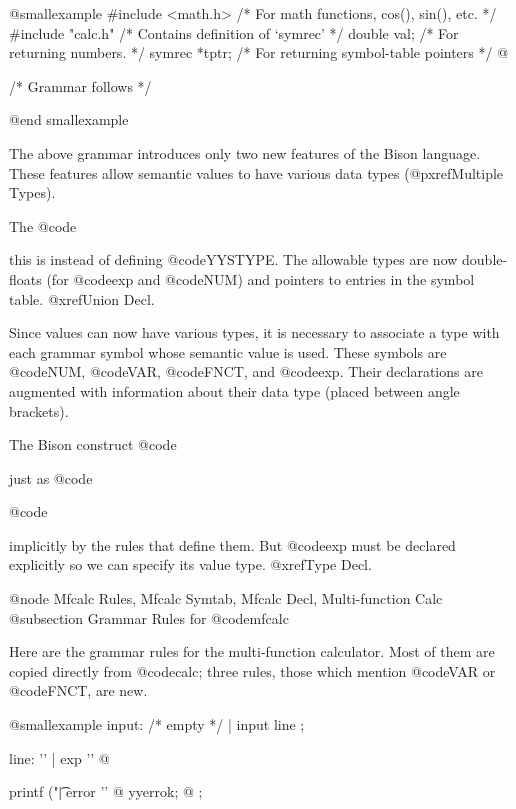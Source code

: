 {{{{{{{{{{@smallexample
#include <math.h>  /* For math functions, cos(), sin(), etc. */
#include "calc.h"  /* Contains definition of `symrec'        */
double     val;  /* For returning numbers.                   */
symrec  *tptr;   /* For returning symbol-table pointers      */
@}



/* Grammar follows */

@end smallexample

The above grammar introduces only two new features of the Bison language.
These features allow semantic values to have various data types
(@pxref{Multiple Types}).

The @code{%
this is instead of defining @code{YYSTYPE}.  The allowable types are now
double-floats (for @code{exp} and @code{NUM}) and pointers to entries in
the symbol table.  @xref{Union Decl}.

Since values can now have various types, it is necessary to associate a
type with each grammar symbol whose semantic value is used.  These symbols
are @code{NUM}, @code{VAR}, @code{FNCT}, and @code{exp}.  Their
declarations are augmented with information about their data type (placed
between angle brackets).

The Bison construct @code{%
just as @code{%
@code{%
implicitly by the rules that define them.  But @code{exp} must be declared
explicitly so we can specify its value type.  @xref{Type Decl}.

@node Mfcalc Rules, Mfcalc Symtab, Mfcalc Decl, Multi-function Calc
@subsection Grammar Rules for @code{mfcalc}

Here are the grammar rules for the multi-function calculator.
Most of them are copied directly from @code{calc}; three rules,
those which mention @code{VAR} or @code{FNCT}, are new.

@smallexample
input:   /* empty */
        | input line
;

line:
          '\n'
        | exp '\n'   @{ printf ("\t%
        | error '\n' @{ yyerrok;                  @}
;

}}}}}}}}}}}}}}
